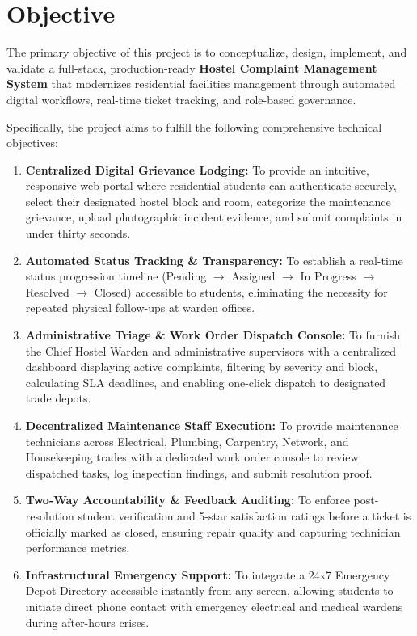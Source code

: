 \documentclass[10pt]{report}
\begin{document}
\section{Objective}
\hspace{0.5cm}The primary objective of this project is to conceptualize, design, implement, and validate a full-stack, production-ready \textbf{Hostel Complaint Management System} that modernizes residential facilities management through automated digital workflows, real-time ticket tracking, and role-based governance.

Specifically, the project aims to fulfill the following comprehensive technical objectives:
\begin{enumerate}[label=(\alph*)]
\item \textbf{Centralized Digital Grievance Lodging:} To provide an intuitive, responsive web portal where residential students can authenticate securely, select their designated hostel block and room, categorize the maintenance grievance, upload photographic incident evidence, and submit complaints in under thirty seconds.
\item \textbf{Automated Status Tracking \& Transparency:} To establish a real-time status progression timeline (Pending $\rightarrow$ Assigned $\rightarrow$ In Progress $\rightarrow$ Resolved $\rightarrow$ Closed) accessible to students, eliminating the necessity for repeated physical follow-ups at warden offices.
\item \textbf{Administrative Triage \& Work Order Dispatch Console:} To furnish the Chief Hostel Warden and administrative supervisors with a centralized dashboard displaying active complaints, filtering by severity and block, calculating SLA deadlines, and enabling one-click dispatch to designated trade depots.
\item \textbf{Decentralized Maintenance Staff Execution:} To provide maintenance technicians across Electrical, Plumbing, Carpentry, Network, and Housekeeping trades with a dedicated work order console to review dispatched tasks, log inspection findings, and submit resolution proof.
\item \textbf{Two-Way Accountability \& Feedback Auditing:} To enforce post-resolution student verification and 5-star satisfaction ratings before a ticket is officially marked as closed, ensuring repair quality and capturing technician performance metrics.
\item \textbf{Infrastructural Emergency Support:} To integrate a 24x7 Emergency Depot Directory accessible instantly from any screen, allowing students to initiate direct phone contact with emergency electrical and medical wardens during after-hours crises.
\end{enumerate}
\end{document}
